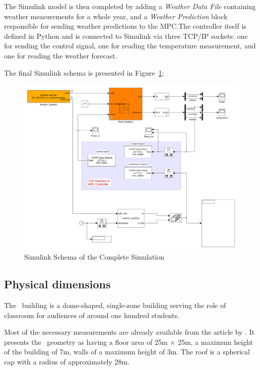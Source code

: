 \clearpage

The Simulink model is then completed by adding a \textit{Weather Data File}
containing weather measurements for a whole year, and a \textit{Weather
Prediction} block responsible for sending weather predictions to the MPC.\@ The
controller itself is defined in Python and is connected to Simulink via three
TCP/IP sockets: one for sending the control signal, one for reading the
temperature measurement, and one for reading the weather forecast.

The final Simulink schema is presented in Figure~\ref{fig:CARNOT_complete}:

\begin{figure}[ht]
    \centering
    \includegraphics[width = \textwidth]{Images/polydome_python.pdf}
    \caption{Simulink Schema of the Complete Simulation}
    \label{fig:CARNOT_complete}
\end{figure}

\clearpage

\subsection{Physical dimensions}\label{sec:Physical_dimensions}

The \pdome\ building is a dome-shaped, single-zone building serving the role
of classroom for audiences of around one hundred students.

Most of the necessary measurements are already available from the
 article by
\textcite{nattererPolydomeTimberShell1993}. It presents the \pdome\ geometry as
having a floor area of 25m $\times$ 25m, a maximum height of the building of 7m,
walls of a maximum height of 3m. The roof is a spherical cap with a radius of
approximately 28m.

